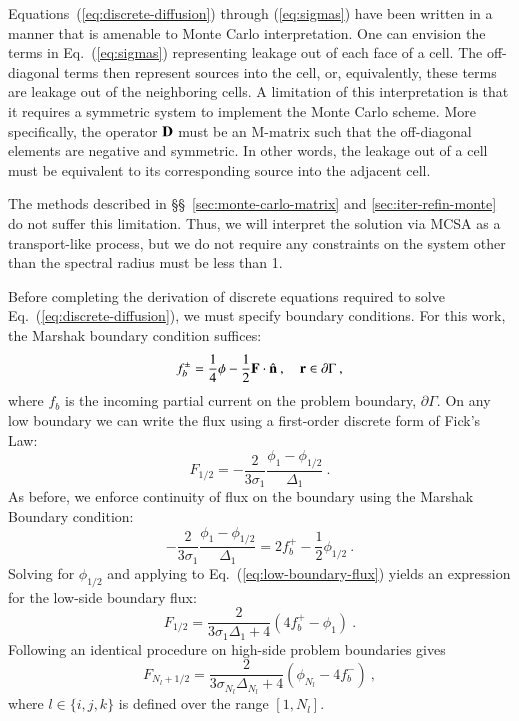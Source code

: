 \documentclass[preprint,12pt]{elsarticle}
\newcommand{\vr}{\ensuremath{\ve{r}}}
\begin{document}
Equations~(\ref{eq:discrete-diffusion}) through (\ref{eq:sigmas}) have been
written in a manner that is amenable to Monte Carlo interpretation.  One can
envision the terms in Eq.~(\ref{eq:sigmas}) representing leakage out of each
face of a cell.  The off-diagonal terms then represent sources into the cell,
or, equivalently, these terms are leakage out of the neighboring cells.  A
limitation of this interpretation is that it requires a symmetric system to
implement the Monte Carlo scheme.  More specifically, the operator $\mathbf{D}$
must be an M-matrix \cite{kelley_1995} such that the off-diagonal elements are
negative and symmetric.  In other words, the leakage out of a cell must be
equivalent to its corresponding source into the adjacent cell.

The methods described in \S\S~\ref{sec:monte-carlo-matrix} and
\ref{sec:iter-refin-monte} do not suffer this limitation.  Thus, we will
interpret the solution via MCSA as a transport-like process, but we do not
require any constraints on the system other than the spectral radius must be
less than 1.

Before completing the derivation of discrete equations required to solve
Eq.~(\ref{eq:discrete-diffusion}), we must specify boundary conditions.  For
this work, the Marshak boundary condition suffices:
\begin{equation}
  f_b^\pm = \frac{1}{4}\phi -
  \frac{1}{2}\ve{F}\cdot\hat{\ve{n}}\:,\quad \vr\in \partial\Gamma\:,
\end{equation}
where $f_b$ is the incoming partial current on the problem boundary,
$\partial\Gamma$.  On any low boundary we can write the flux using a
first-order discrete form of Fick's Law:
\begin{equation}
  F_{1/2} = -\frac{2}{3\sigma_1}\frac{\phi_1 -
    \phi_{1/2}}{\Delta_1}\:.
  \label{eq:low-boundary-flux}
\end{equation}
As before, we enforce continuity of flux on the boundary using the
Marshak Boundary condition:
\begin{equation}
  -\frac{2}{3\sigma_1}\frac{\phi_1 - \phi_{1/2}}{\Delta_1} = 2f_b^{+}
  -\frac{1}{2}\phi_{1/2}\:.
\end{equation}
Solving for $\phi_{1/2}$ and applying to Eq.~(\ref{eq:low-boundary-flux})
yields an expression for the low-side boundary flux:
\begin{equation}
  F_{1/2} = \frac{2}{3\sigma_1\Delta_1 + 4}(4f_b^{+}-\phi_1)\:.
\end{equation}
Following an identical procedure on high-side problem boundaries gives
\begin{equation}
  F_{N_l+1/2} = \frac{2}{3\sigma_{N_l}\Delta_{N_l} +
    4}(\phi_{N_l}-4f_b^{-})\:,
\end{equation}
where $l\in\{i,j,k\}$ is defined over the range $[1,N_l]$.
\end{document}
